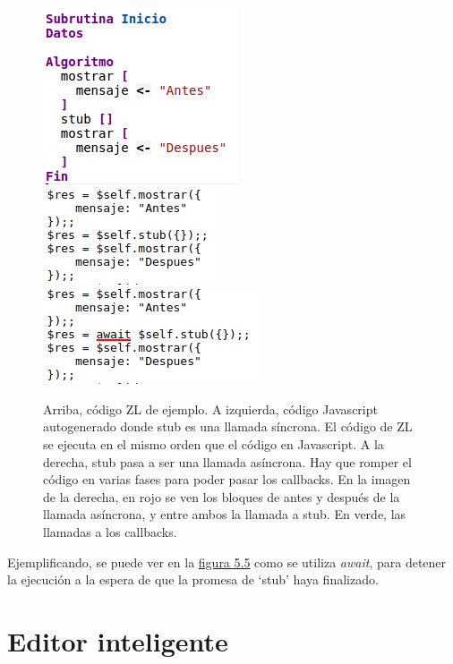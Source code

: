 \documentclass{report}
\begin{document}
	\vspace{10px}
	
\begin{figure}
	\centering
	\includegraphics{asincrono}	
	\\
	
	\includegraphics[width=0.45\linewidth]{asincrono3}
	\includegraphics[width=0.45\linewidth]{asincrono2}

	\caption[Diferencias entre código asíncrono y síncrono.]{Arriba, código ZL de ejemplo. A izquierda, código Javascript autogenerado donde stub es una llamada síncrona. El código de ZL se ejecuta en el mismo orden que el código en Javascript. A la derecha, stub pasa a ser una llamada asíncrona. Hay que romper el código en varias fases para poder pasar los callbacks. En la imagen de la derecha, en rojo se ven los bloques de antes y después de la llamada asíncrona, y entre ambos la llamada a stub. En verde, las llamadas a los callbacks.}
\label{fig:asincrono}
\end{figure}


	 Ejemplificando, se puede ver en la \hyperref[fig:asincrono]{figura 5.5} como se utiliza \textit{await}, para detener la ejecución a la espera de que la promesa de `stub' haya finalizado.
	 	
	\section{Editor inteligente}
	
\end{document}
